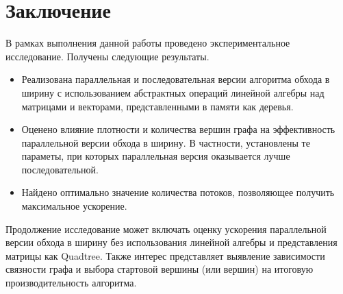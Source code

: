 
\section*{Заключение}
В рамках выполнения данной работы проведено экспериментальное исследование. Получены следующие результаты.
\begin{itemize}
    \item Реализована параллельная и последовательная версии алгоритма обхода в ширину с использованием абстрактных операций линейной алгебры над матрицами и векторами, представленными в памяти как деревья.
    \item Оценено влияние плотности и количества вершин графа на эффективность параллельной версии обхода в ширину. В частности, установлены те параметы, при которых параллельная версия оказывается лучше последовательной.
    \item Найдено оптимально значение количества потоков, позволяющее получить максимальное ускорение.
\end{itemize}

Продолжение исследование может включать оценку ускорения параллельной версии обхода в ширину без использования линейной алгебры и представления матрицы как Quadtree.
Также интерес представляет выявление зависимости связности графа и выбора стартовой вершины (или вершин) на итоговую производительность алгоритма.